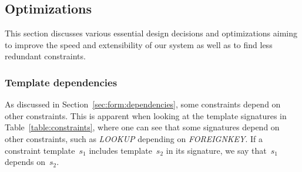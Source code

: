 \documentclass{IEEEtran}
\newcommand{\samuel}[1]{\textcolor{green}{{\sc Samuel:} #1}\xspace}
\newcommand{\tias}[1]{\textcolor{blue}{{\sc Tias:} #1}\xspace}
\theoremstyle{definition}
\begin{document}







\subsection{Optimizations}
This section discusses various essential design decisions and optimizations aiming to improve the speed and extensibility of our system as well as to find less redundant constraints.





\subsubsection{Template dependencies}
As discussed in Section~\ref{sec:form:dependencies}, some constraints depend on other constraints.
This is apparent when looking at the template signatures in Table~\ref{table:constraints}, where one can see that some signatures depend on other constraints, such as \textit{LOOKUP} depending on \textit{FOREIGNKEY}.
If a constraint template~$s_1$ includes template~$s_2$ in its signature, we say that~$s_1$ depends on~$s_2$.
\end{document}
